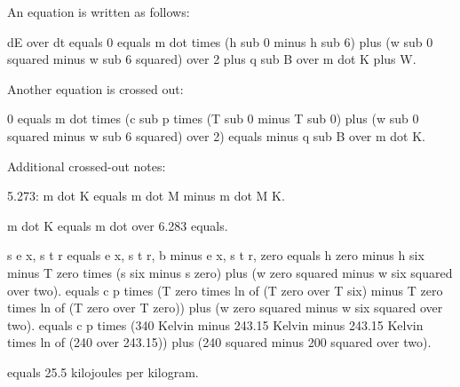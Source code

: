An equation is written as follows: 

dE over dt equals 0 equals m dot times (h sub 0 minus h sub 6) plus (w sub 0 squared minus w sub 6 squared) over 2 plus q sub B over m dot K plus W.

Another equation is crossed out:

0 equals m dot times (c sub p times (T sub 0 minus T sub 0) plus (w sub 0 squared minus w sub 6 squared) over 2) equals minus q sub B over m dot K.

Additional crossed-out notes:

5.273: m dot K equals m dot M minus m dot M K.

m dot K equals m dot over 6.283 equals.

s e x, s t r equals e x, s t r, b minus e x, s t r, zero equals h zero minus h six minus T zero times (s six minus s zero) plus (w zero squared minus w six squared over two).  
equals c p times (T zero times ln of (T zero over T six) minus T zero times ln of (T zero over T zero)) plus (w zero squared minus w six squared over two).  
equals c p times (340 Kelvin minus 243.15 Kelvin minus 243.15 Kelvin times ln of (240 over 243.15)) plus (240 squared minus 200 squared over two).

equals 25.5 kilojoules per kilogram.